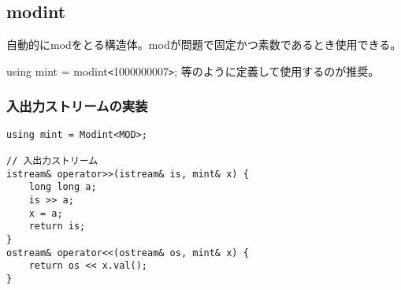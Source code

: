 \subsection{modint}

自動的にmodをとる構造体。modが問題で固定かつ素数であるとき使用できる。

using mint = modint\verb|<|1000000007\verb|>|; 等のように定義して使用するのが推奨。



\subsubsection*{入出力ストリームの実装}

\begin{lstlisting}
using mint = Modint<MOD>;

// 入出力ストリーム
istream& operator>>(istream& is, mint& x) {
    long long a;
    is >> a;
    x = a;
    return is;
}
ostream& operator<<(ostream& os, mint& x) {
    return os << x.val();
}
\end{lstlisting}